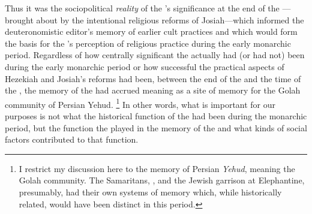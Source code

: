 Thus it was the sociopolitical \emph{reality} of the \jerusalemtemple's significance at the end of the ---brought about by the intentional religious reforms of Josiah---which informed the deuteronomistic editor's memory of earlier \yahwistic cult practices and which would form the basis for the \chronicler's perception of religious practice during the early monarchic period. Regardless of how centrally significant the \jerusalemtemple actually had (or had not) been during the early monarchic period or how successful the practical aspects of Hezekiah and Josiah's reforms had been, between the end of the  and the time of the \chronicler, the memory of the \temple had accrued meaning as a site of memory for the Golah community of Persian Yehud.%
    \footnote{I restrict my discussion here to the memory of Persian \emph{Yehud}, meaning the Golah community. The Samaritans, , and the Jewish garrison at Elephantine, presumably, had their own systems of memory which, while historically related, would have been distinct in this period.}
In other words, what is important for our purposes is not what the historical function of the \temple had been during the monarchic period, but the function the \jerusalemtemple played in the memory of the \chronicler and what kinds of social factors contributed to that function.

